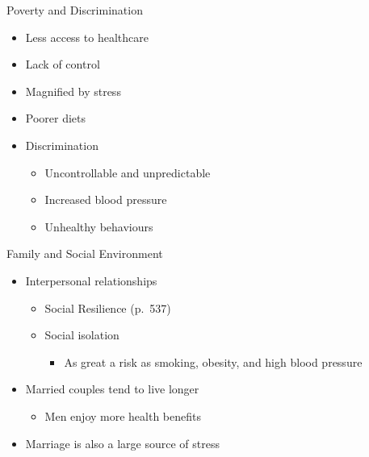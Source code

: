 \documentclass[
]{book}
\providecommand{\tightlist}{%
  \setlength{\itemsep}{0pt}\setlength{\parskip}{0pt}}
\begin{document}
\begin{reflect}
Poverty and Discrimination

\begin{itemize}
\tightlist
\item
  Less access to healthcare\\
\item
  Lack of control\\
\item
  Magnified by stress\\
\item
  Poorer diets\\
\item
  Discrimination

  \begin{itemize}
  \tightlist
  \item
    Uncontrollable and unpredictable\\
  \item
    Increased blood pressure\\
  \item
    Unhealthy behaviours
  \end{itemize}
\end{itemize}

Family and Social Environment

\begin{itemize}
\tightlist
\item
  Interpersonal relationships

  \begin{itemize}
  \tightlist
  \item
    Social Resilience (p.~537)\\
  \item
    Social isolation

    \begin{itemize}
    \tightlist
    \item
      As great a risk as smoking, obesity, and high blood pressure\\
    \end{itemize}
  \end{itemize}
\item
  Married couples tend to live longer

  \begin{itemize}
  \tightlist
  \item
    Men enjoy more health benefits\\
  \end{itemize}
\item
  Marriage is also a large source of stress


\end{itemize}
\end{reflect}
\end{document}
